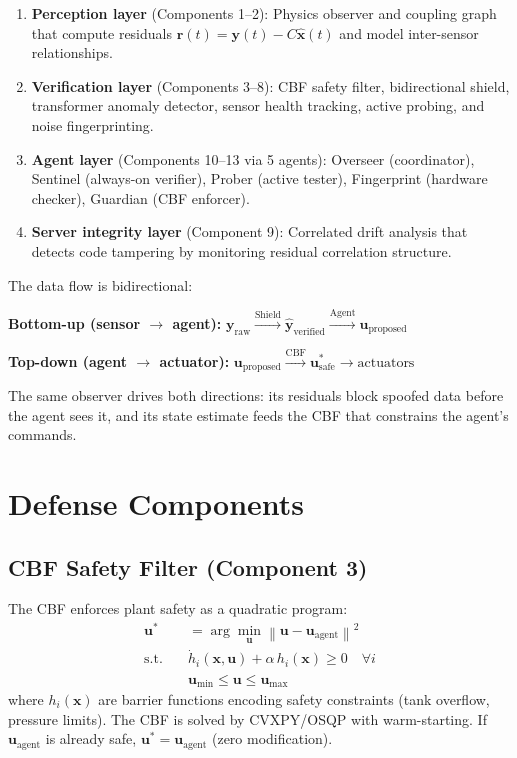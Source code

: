 \documentclass[journal]{IEEEtran}
\newcommand{\norm}[1]{\left\|#1\right\|}
\begin{document}
\begin{enumerate}[leftmargin=*]
\item \textbf{Perception layer} (Components 1--2): Physics observer and coupling graph that compute residuals $\bm{r}(t) = \bm{y}(t) - C\hat{\bm{x}}(t)$ and model inter-sensor relationships.

\item \textbf{Verification layer} (Components 3--8): CBF safety filter, bidirectional shield, transformer anomaly detector, sensor health tracking, active probing, and noise fingerprinting.

\item \textbf{Agent layer} (Components 10--13 via 5 agents): Overseer (coordinator), Sentinel (always-on verifier), Prober (active tester), Fingerprint (hardware checker), Guardian (CBF enforcer).

\item \textbf{Server integrity layer} (Component 9): Correlated drift analysis that detects code tampering by monitoring residual correlation structure.
\end{enumerate}

The data flow is bidirectional:

\medskip
\noindent\textbf{Bottom-up (sensor $\to$ agent):}
$\bm{y}_{\text{raw}} \xrightarrow{\text{Shield}} \hat{\bm{y}}_{\text{verified}} \xrightarrow{\text{Agent}} \bm{u}_{\text{proposed}}$

\noindent\textbf{Top-down (agent $\to$ actuator):}
$\bm{u}_{\text{proposed}} \xrightarrow{\text{CBF}} \bm{u}^*_{\text{safe}} \to \text{actuators}$

\medskip
The same observer drives both directions: its residuals block spoofed data before the agent sees it, and its state estimate feeds the CBF that constrains the agent's commands.


\section{Defense Components}
\label{sec:components}

\subsection{CBF Safety Filter (Component 3)}

The CBF enforces plant safety as a quadratic program:
\begin{align}
  \bm{u}^* &= \arg\min_{\bm{u}} \norm{\bm{u} - \bm{u}_{\text{agent}}}^2 \label{eq:cbf_obj}\\
  \text{s.t.}\quad & \dot{h}_i(\bm{x}, \bm{u}) + \alpha \, h_i(\bm{x}) \ge 0 \quad \forall i \label{eq:cbf_constraint}\\
  & \bm{u}_{\min} \le \bm{u} \le \bm{u}_{\max} \label{eq:cbf_bounds}
\end{align}
where $h_i(\bm{x})$ are barrier functions encoding safety constraints (tank overflow, pressure limits). The CBF is solved by CVXPY/OSQP with warm-starting. If $\bm{u}_{\text{agent}}$ is already safe, $\bm{u}^* = \bm{u}_{\text{agent}}$ (zero modification).
\end{document}
